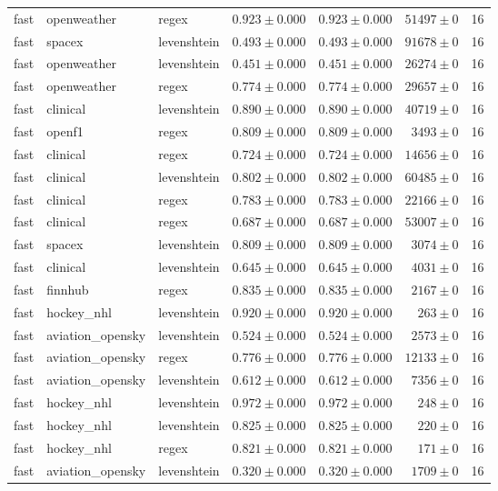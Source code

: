 \begin{table}[htbp]
\begin{tabular}{l l l r r r r}
fast & openweather & regex & $0.923\pm0.000$ & $0.923\pm0.000$ & $51497\pm0$ & 16 \\
fast & spacex & levenshtein & $0.493\pm0.000$ & $0.493\pm0.000$ & $91678\pm0$ & 16 \\
fast & openweather & levenshtein & $0.451\pm0.000$ & $0.451\pm0.000$ & $26274\pm0$ & 16 \\
fast & openweather & regex & $0.774\pm0.000$ & $0.774\pm0.000$ & $29657\pm0$ & 16 \\
fast & clinical & levenshtein & $0.890\pm0.000$ & $0.890\pm0.000$ & $40719\pm0$ & 16 \\
fast & openf1 & regex & $0.809\pm0.000$ & $0.809\pm0.000$ & $3493\pm0$ & 16 \\
fast & clinical & regex & $0.724\pm0.000$ & $0.724\pm0.000$ & $14656\pm0$ & 16 \\
fast & clinical & levenshtein & $0.802\pm0.000$ & $0.802\pm0.000$ & $60485\pm0$ & 16 \\
fast & clinical & regex & $0.783\pm0.000$ & $0.783\pm0.000$ & $22166\pm0$ & 16 \\
fast & clinical & regex & $0.687\pm0.000$ & $0.687\pm0.000$ & $53007\pm0$ & 16 \\
fast & spacex & levenshtein & $0.809\pm0.000$ & $0.809\pm0.000$ & $3074\pm0$ & 16 \\
fast & clinical & levenshtein & $0.645\pm0.000$ & $0.645\pm0.000$ & $4031\pm0$ & 16 \\
fast & finnhub & regex & $0.835\pm0.000$ & $0.835\pm0.000$ & $2167\pm0$ & 16 \\
fast & hockey\_nhl & levenshtein & $0.920\pm0.000$ & $0.920\pm0.000$ & $263\pm0$ & 16 \\
fast & aviation\_opensky & levenshtein & $0.524\pm0.000$ & $0.524\pm0.000$ & $2573\pm0$ & 16 \\
fast & aviation\_opensky & regex & $0.776\pm0.000$ & $0.776\pm0.000$ & $12133\pm0$ & 16 \\
fast & aviation\_opensky & levenshtein & $0.612\pm0.000$ & $0.612\pm0.000$ & $7356\pm0$ & 16 \\
fast & hockey\_nhl & levenshtein & $0.972\pm0.000$ & $0.972\pm0.000$ & $248\pm0$ & 16 \\
fast & hockey\_nhl & levenshtein & $0.825\pm0.000$ & $0.825\pm0.000$ & $220\pm0$ & 16 \\
fast & hockey\_nhl & regex & $0.821\pm0.000$ & $0.821\pm0.000$ & $171\pm0$ & 16 \\
fast & aviation\_opensky & levenshtein & $0.320\pm0.000$ & $0.320\pm0.000$ & $1709\pm0$ & 16 \\

\end{tabular}
\end{table}
